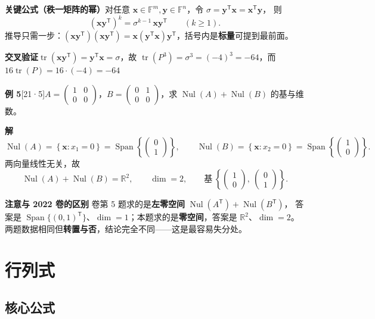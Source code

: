 \documentclass[10pt]{ctexart}
\newcommand{\Rr}{\mathbb{R}}
\newcommand{\FF}{\mathbb{F}}
\newcommand{\Nul}{\operatorname{Nul}}
\newcommand{\Span}{\operatorname{Span}}
\newcommand{\tr}{\operatorname{tr}}
\newcommand{\TT}{^{\mathsf T}}
\newcommand{\bv}[1]{\begin{pmatrix}#1\end{pmatrix}}
\newcommand{\y}[1]{\textcolor{y21}{[21·#1]}}
\begin{document}
\begin{tipbox}
\textbf{关键公式（秩一矩阵的幂）}\quad 对任意 $\mathbf x\in\FF^m,\mathbf y\in\FF^n$，令 $\sigma=\mathbf y\TT\mathbf x=\mathbf x\TT\mathbf y$，
则
\[
(\mathbf x\mathbf y\TT)^k=\sigma^{k-1}\,\mathbf x\mathbf y\TT\qquad(k\ge1).
\]
推导只需一步：$(\mathbf x\mathbf y\TT)(\mathbf x\mathbf y\TT)=\mathbf x(\mathbf y\TT\mathbf x)\mathbf y\TT$，括号内是\textbf{标量}可提到最前面。

\textbf{交叉验证}\quad $\tr(\mathbf x\mathbf y\TT)=\mathbf y\TT\mathbf x=\sigma$，故
$\tr(P^3)=\sigma^3=(-4)^3=-64$，而 $16\tr(P)=16\cdot(-4)=-64$ \checkmark
\end{tipbox}

\medskip
\textbf{例 5}\y{5}\quad $A=\bv{1&0\\0&0}$，$B=\bv{0&1\\0&0}$，求 $\Nul(A)+\Nul(B)$ 的基与维数。

\textbf{解}\quad
\[
\Nul(A)=\left\{\mathbf x:x_1=0\right\}=\Span\left\{\bv{0\\1}\right\},\qquad
\Nul(B)=\left\{\mathbf x:x_2=0\right\}=\Span\left\{\bv{1\\0}\right\}.
\]
两向量线性无关，故
\[
\Nul(A)+\Nul(B)=\Rr^2,\qquad \dim=2,\qquad \text{基}\ \left\{\bv{1\\0},\ \bv{0\\1}\right\}.
\]

\begin{warnbox}
\textbf{注意与 2022 卷的区别} 卷第 5 题求的是\textbf{左零空间} $\Nul(A\TT)+\Nul(B\TT)$，
答案是 $\Span\{(0,1)\TT\}$、$\dim=1$；本题求的是\textbf{零空间}，答案是 $\Rr^2$、$\dim=2$。
两题数据相同但\textbf{转置与否}，结论完全不同——这是最容易失分处。
\end{warnbox}

\section{行列式}

\subsection{核心公式}
\end{document}
